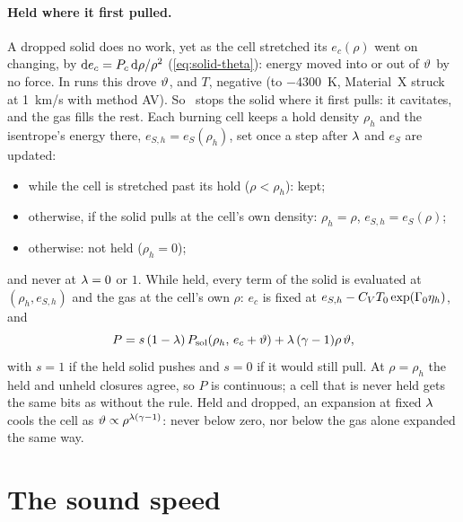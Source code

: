 \paragraph{Held where it first pulled.} A dropped solid does no work, yet as
the cell stretched its $e_c(\rho)$ went on changing, by
$\mathrm{d} e_c = P_{c}\,\mathrm{d}\rho/\rho^2$ (\cref{eq:solid-theta}): energy moved into or
out of $\vartheta$ by no force. In runs this drove $\vartheta$, and $T$, negative
(to $-4300$~K, Material~X struck at 1~km/s with method AV). So \bw\ stops
the solid where it first pulls: it cavitates, and the gas fills the rest.
Each burning cell keeps a hold density $\rho_h$ and the isentrope's energy
there, $e_{S,h} = e_S(\rho_h)$, set once a step after $\lambda$ and $e_S$ are
updated:
\begin{itemize}
\item while the cell is stretched past its hold ($\rho < \rho_h$): kept;
\item otherwise, if the solid pulls at the cell's own density: $\rho_h =
  \rho$, $e_{S,h} = e_S(\rho)$;
\item otherwise: not held ($\rho_h = 0$);
\end{itemize}
and never at $\lambda = 0$ or $1$. While held, every term of the solid is
evaluated at $(\rho_h, e_{S,h})$ and the gas at the cell's own $\rho$:
$e_c$ is fixed at $e_{S,h} - C_{V} T_0\exp(\Gamma_0\eta_h)$, and
\begin{equation}
  P = s\,(1 - \lambda)\,P_{\mathrm{sol}}(\rho_h,\, e_c + \vartheta) + \lambda\,(\gamma - 1)\rho\,\vartheta,
  \label{eq:held}
\end{equation}
with $s = 1$ if the held solid pushes and $s = 0$ if it would still pull.
At $\rho = \rho_h$ the held and unheld closures agree, so $P$ is
continuous; a cell that is never held gets the same bits as without the
rule. Held and dropped, an expansion at fixed $\lambda$ cools the cell as
$\vartheta \propto \rho^{\lambda(\gamma - 1)}$: never below zero, nor below the gas
alone expanded the same way.

\section{The sound speed}
\label{sec:sound-speed}

